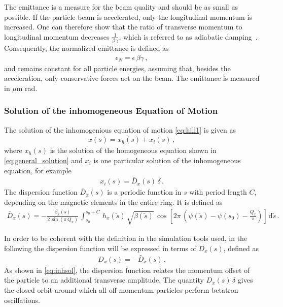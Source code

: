 %
The emittance is a measure for the beam quality and should be as small as possible. If the particle beam is accelerated, only the longitudinal momentum is increased. One can therefore show that the ratio of transverse momentum to longitudinal momentum decreases $\frac{1}{\beta \, \gamma}$, which is referred to as adiabatic damping~\cite{wiedemann1999particle}. Consequently, the normalized emittance is defined as 
%
\begin{align}
  \epsilon_N = \epsilon \, \beta \gamma \, ,
\end{align}
and remains constant for all particle energies, assuming that, besides the acceleration, only conservative forces  act on the beam. The emittance is measured in $\mu$m rad.




\subsubsection{Solution of the inhomogeneous Equation of Motion}


The solution of the inhomogenious equation of motion \eqref{eq:hill1} is given as
%
\begin{align}
  x(s) = x_h(s) + x_i(s) \, , \label{eq:inhsol}
\end{align}
%
where $x_h(s)$ is the solution of the homogeneous equation shown in \eqref{eq:general_solution} and $x_i$ is one particular solution of the inhomogeneous equation, for example
%
\begin{align}
  x_i(s) = \bar{D}_x(s) \, \delta \, .
\end{align}
%
The dispersion function $\bar{D}_x(s)$ is a periodic function in $s$ with period length $C$, depending on the magnetic elements in the entire ring. It is defined as
%
\begin{align}
  \bar{D}_x (s) = - \frac{\beta_x(s)}{2 \, \sin (\pi \, Q_x)} \, \int_{s_0}^{s_0+C} \, h_x(\tilde{s}) \, \sqrt{\beta(\tilde{s})} \, \cos \left[ 2 \pi \, \left( \psi(\tilde{s}) - \psi(s_0) - \frac{Q_x}{s} \right) \right] \, \mathrm{d} \tilde{s} \, .
\end{align}

In order to be coherent with the definition in the simulation tools used, in the following the dispersion function will be expressed in terms of $D_x(s)$, defined as
%
\begin{align}
  D_x(s) = -\bar{D}_x(s) \, .
\end{align}
%
As shown in \eqref{eq:inhsol}, the dispersion function relates the momentum offset of the particle to an additional transverse amplitude. The quantity $D_x (s) \, \delta$ gives the closed orbit around which all off-momentum particles perform betatron oscillations. 


